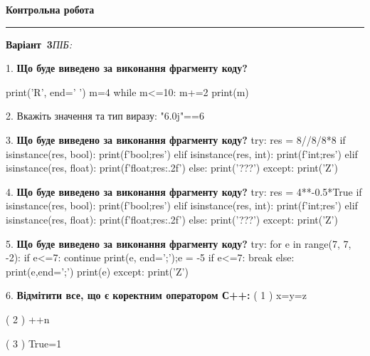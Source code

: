 \documentclass[11pt]{article}
\begin{document}
{\centering\Large\bfseries Контрольна робота\par}
\medskip
\noindent\rule{\linewidth}{0.5pt}
\smallskip
\noindent\textbf{Варіант \No\,3}\hfill \textit{ПІБ:}\,\underline{\hspace{60mm}}
\vspace{4mm}

1. \textbf{Що буде виведено за виконання фрагменту коду?}

print('R', end=' ')
m=4
while m<=10:
    m+=2
print(m)

\par\vspace{5mm}

2. 
Вкажіть значення та тип виразу:
"6.0j"==6
\par\vspace{5mm}

3. \textbf{Що буде виведено за виконання фрагменту коду?}
try:
    res = 8//8/8*8
    if isinstance(res, bool):
        print(f'bool;{res}')
    elif isinstance(res, int):
        print(f'int;{res}')
    elif isinstance(res, float):
        print(f'float;{res:.2f}')
    else:
        print('???')
except:
    print('Z')
\par\vspace{5mm}

4. \textbf{Що буде виведено за виконання фрагменту коду?}
try:
    res = 4**-0.5*True
    if isinstance(res, bool):
        print(f'bool;{res}')
    elif isinstance(res, int):
        print(f'int;{res}')
    elif isinstance(res, float):
        print(f'float;{res:.2f}')
    else:
        print('???')
except:
    print('Z')
\par\vspace{5mm}

5. \textbf{Що буде виведено за виконання фрагменту коду?}
try:
    for e in range(7, 7, -2):
        if e<=7:
            continue
        print(e, end=';');e = -5
        if e<=7:
            break
    else:
        print(e,end=';')
    print(e)
except:
    print('Z')
\par\vspace{5mm}

6. %
\textbf{Відмітити все, що є коректним оператором С++:}
( 1 ) x=y=z

( 2 ) ++n

( 3 ) True=1
\end{document}
